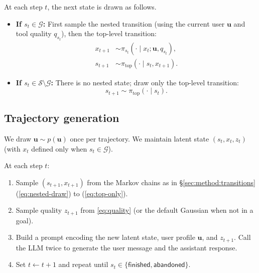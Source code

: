 At each step $t$, the next state is drawn as follows.

\begin{itemize}
  \item \textbf{If $s_t \in \mathcal{G}$:} First sample the nested transition (using the current user $\mathbf{u}$ and tool quality $q_{s_t}$), then the top-level transition:
  \begin{align}
    x_{t+1} &\sim \pi_{s_t}(\cdot \mid x_t; \mathbf{u}, q_{s_t}), \label{eq:nested-draw} \\
    s_{t+1} &\sim \pi_{\mathrm{top}}(\cdot \mid s_t, x_{t+1}). \label{eq:top-draw}
  \end{align}

  \item \textbf{If $s_t \in \mathcal{S} \setminus \mathcal{G}$:} There is no nested state; draw only the top-level transition:
  \begin{equation}
    s_{t+1} \sim \pi_{\mathrm{top}}(\cdot \mid s_t). \label{eq:top-only}
  \end{equation}
\end{itemize}

\subsection{Trajectory generation}
\label{sec:method:generation}

We draw $\mathbf{u} \sim p(\mathbf{u})$ once per trajectory. We maintain latent state $(s_t, x_t, z_t)$ (with $x_t$ defined only when $s_t \in \mathcal{G}$).

At each step $t$:
\begin{enumerate}
  \item Sample $(s_{t+1}, x_{t+1})$ from the Markov chains as in \S\ref{sec:method:transitions} (\ref{eq:nested-draw}) to (\ref{eq:top-only}).
  \item Sample quality $z_{t+1}$ from \eqref{eq:quality} (or the default Gaussian when not in a goal).
  \item Build a prompt encoding the new latent state, user profile $\mathbf{u}$, and $z_{t+1}$. Call the LLM twice to generate the user message and the assistant response.
  \item Set $t \leftarrow t+1$ and repeat until $s_t \in \{\mathsf{finished},\mathsf{abandoned}\}$.
\end{enumerate}

